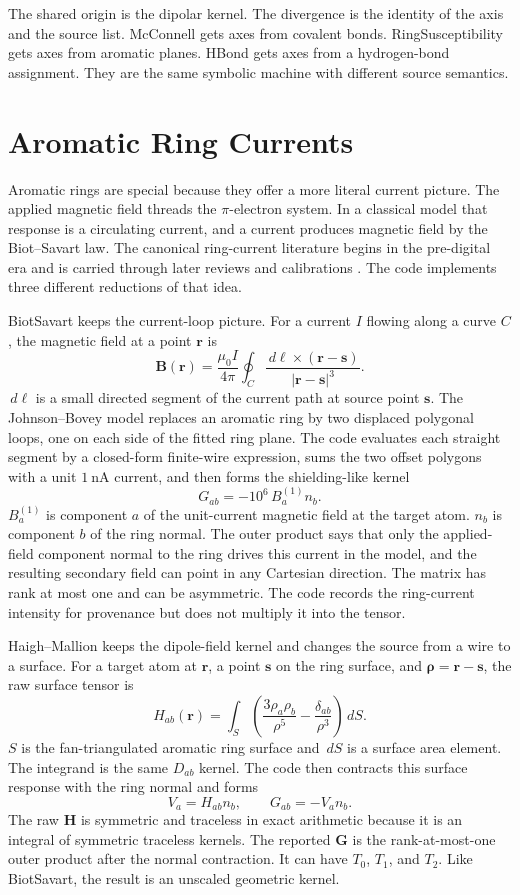 \documentclass[11pt]{article}
\newcommand{\dd}{\,d}
\begin{document}
The shared origin is the dipolar kernel. The divergence is the identity of the
axis and the source list. McConnell gets axes from covalent bonds.
RingSusceptibility gets axes from aromatic planes. HBond gets axes from a
hydrogen-bond assignment. They are the same symbolic machine with different
source semantics.

\section{Aromatic Ring Currents}

Aromatic rings are special because they offer a more literal current picture.
The applied magnetic field threads the \(\pi\)-electron system. In a classical
model that response is a circulating current, and a current produces magnetic
field by the Biot--Savart law. The canonical ring-current literature begins in
the pre-digital era and is carried through later reviews and calibrations
\cite{pople1956,johnson1958,haigh1979,case1995,boyd2002}. The code implements
three different reductions of that idea.

BiotSavart keeps the current-loop picture. For a current \(I\) flowing along a
curve \(C\), the magnetic field at a point \(\bm r\) is
\[
  \bm B(\bm r)
  =
  \frac{\mu_0 I}{4\pi}
  \oint_C
  \frac{\dd\bm\ell\times(\bm r-\bm s)}
       {|\bm r-\bm s|^3}.
\]
\(\dd\bm\ell\) is a small directed segment of the current path at source point
\(\bm s\). The Johnson--Bovey model replaces an aromatic ring by two displaced
polygonal loops, one on each side of the fitted ring plane. The code evaluates
each straight segment by a closed-form finite-wire expression, sums the two
offset polygons with a unit \(\SI{1}{\nano\ampere}\) current, and then forms
the shielding-like kernel
\[
  G_{ab}=-10^6\,B^{(1)}_a n_b .
\]
\(B^{(1)}_a\) is component \(a\) of the unit-current magnetic field at the
target atom. \(n_b\) is component \(b\) of the ring normal. The outer product
says that only the applied-field component normal to the ring drives this
current in the model, and the resulting secondary field can point in any
Cartesian direction. The matrix has rank at most one and can be asymmetric.
The code records the ring-current intensity for provenance but does not multiply
it into the tensor.

Haigh--Mallion keeps the dipole-field kernel and changes the source from a wire
to a surface. For a target atom at \(\bm r\), a point \(\bm s\) on the ring
surface, and \(\bm\rho=\bm r-\bm s\), the raw surface tensor is
\[
  H_{ab}(\bm r)
  =
  \int_S
  \left(
    \frac{3\rho_a\rho_b}{\rho^5}
    -\frac{\delta_{ab}}{\rho^3}
  \right)
  \dd S .
\]
\(S\) is the fan-triangulated aromatic ring surface and \(\dd S\) is a surface
area element. The integrand is the same \(D_{ab}\) kernel. The code then
contracts this surface response with the ring normal and forms
\[
  V_a=H_{ab}n_b,
  \qquad
  G_{ab}=-V_a n_b .
\]
The raw \(\bm H\) is symmetric and traceless in exact arithmetic because it is
an integral of symmetric traceless kernels. The reported \(\bm G\) is the
rank-at-most-one outer product after the normal contraction. It can have
\(T_0\), \(T_1\), and \(T_2\). Like BiotSavart, the result is an unscaled
geometric kernel.
\end{document}
